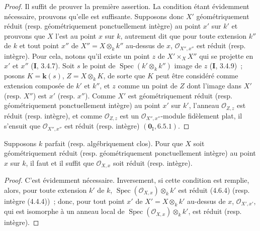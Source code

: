 \begin{proof}
Il suffit de prouver la première assertion. La condition étant évidemment
nécessaire, prouvons qu'elle est suffisante. Supposons donc $X'$
géométriquement réduit (resp. géométriquement ponctuellement intègre) au point
$x'$ sur $k'$ et prouvons que $X$ l'est au point $x$ sur $k$, autrement dit que
pour toute extension $k''$ de $k$ et tout point $x''$ de
$X''=X\otimes_k k''$ au-dessus de $x$, $\mathcal O_{X'',x''}$ est réduit (resp.
intègre). Pour cela, notons qu'il existe un point $z$ de $X'\times_X X''$ qui
se projette en $x'$ et $x''$ (\textbf{I}, 3.4.7). Soit $s$ le point de
$\operatorname{Spec}(k'\otimes_k k'')$ image de $z$ (\textbf{I}, 3.4.9)~; posons
$K=\boldsymbol{k}(s)$, $Z=X\otimes_k K$, de sorte que $K$ peut être considéré comme
extension composée de $k'$ et $k''$, et $z$ comme un point de $Z$ dont l'image
dans $X'$ (resp. $X''$) est $x'$ (resp. $x''$). Comme $X'$ est
géométriquement réduit (resp. géométriquement ponctuellement intègre) au point
$x'$ sur $k'$, l'anneau $\mathcal O_{Z,z}$ est réduit (resp. intègre), et comme
$\mathcal O_{Z,z}$ est un $\mathcal O_{X'',x''}$-module fidèlement plat, il
s'ensuit que $\mathcal O_{X'',x''}$ est réduit (resp. intègre)
$(\mathbf{0}_{\mathrm I},6.5.1)$.
\end{proof}

\begin{corollary}[4.6.11]
\label{IV.2.4.6.11-fr}
Supposons $k$ parfait \textup{(resp.} algébriquement clos). Pour que $X$ soit
géométriquement réduit \textup{(resp.} géométriquement ponctuellement intègre) au point
$x$ sur $k$, il faut et il suffit que $\mathcal O_{X,x}$ soit réduit \textup{(resp.}
intègre).
\end{corollary}

\begin{proof}
C'est évidemment nécessaire. Inversement, si cette condition est remplie,
alors, pour toute extension $k'$ de $k$,
$\operatorname{Spec}(\mathcal O_{X,x})\otimes_k k'$ est réduit (4.6.4) (resp.
intègre (4.4.4))~;
donc, pour tout point $x'$ de $X'=X\otimes_k k'$ au-dessus de $x$,
$\mathcal O_{X',x'}$, qui est isomorphe à un anneau local de
$\operatorname{Spec}(\mathcal O_{X,x})\otimes_k k'$, est réduit (resp.
intègre).
\end{proof}

